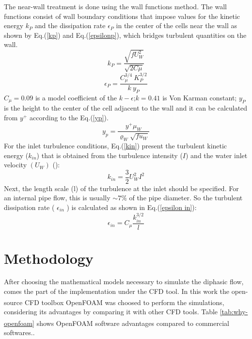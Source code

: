 \documentclass[11pt]{report}
\newcommand{\openfoam}{Open\nolinebreak\hspace{-.2em}{\color{blue}\Large$\nabla$}\nolinebreak\hspace{-.2em}FOAM\textsuperscript{\textregistered}\xspace}
\begin{document}
The near-wall treatment is done using the wall functions method. 
%
The wall functions consist of wall boundary conditions that impose values for the kinetic energy $k_{P}$ and the dissipation rate $\epsilon_{P}$  in the center of the cells near the wall as shown by Eq.(\ref{kp}) and Eq.(\ref{epsilonp}), which bridges turbulent quantities on the wall.
%
\begin{equation}
k_{P} =\frac{\sqrt{f {U_{W}^2 }}}{\sqrt{2 C\mu }}
\label{kp}
\end{equation}
%
\begin{equation}
\epsilon_{P} =\frac{C^{3/4}_{\mu } \ K^{3/2}_{P}}{k\ y_{P}}
\label{epsilonp}
\end{equation}
\(C_{\mu}=0.09\) is a model coefficient of the \(k-\epsilon\);\quad $k=0.41$ is Von Karman constant; 
%
$y_{P}$ is the height to the center of the cell adjacent to the wall and it can be calculated from $y^+$ according to the Eq.(\ref{yp}).
%
\begin{equation}
y_{p}=\frac{y^{+} \mu_W}{\varrho_W\sqrt{f u_{W}}}
\label{yp}
\end{equation}
%
For the inlet turbulence conditions, Eq.(\ref{kin}) present the turbulent kinetic energy (\(k_{in}\)) that is obtained from the turbulence intensity (\(I\)) and the water inlet velocity \((U_W)\) (\citet{Messa-2020}):
%
\begin{equation}
k_{in} =\frac{3}{2} U_W^{2} I^{2} 
\label{kin}
\end{equation}
%
Next, the length scale (l) of the turbulence at the inlet should be specified. 
%
For an internal pipe flow, this is usually \(\sim 7 \%\) of the pipe diameter. So the turbulent dissipation rate ( \(\epsilon_{in}\) ) is calculated as shown in Eq.(\ref{epsilon in}): 
%
\begin{equation}
\epsilon_{in}=C_{\mu} \frac{k_{in}^{3 / 2}}{l} 
\label{epsilon in}
\end{equation}
%
\section{Methodology}
%
After choosing the mathematical models necessary to simulate the diphasic flow, comes the part of the implementation under the CFD tool. 
%
In this work the open-source CFD toolbox \openfoam was choosed to perform the simulations, considering its advantages by comparing it with other CFD tools.
%
Table \ref{tab:why-openfoam} shows \openfoam software advantages compared to commercial softwares..\\
\end{document}
